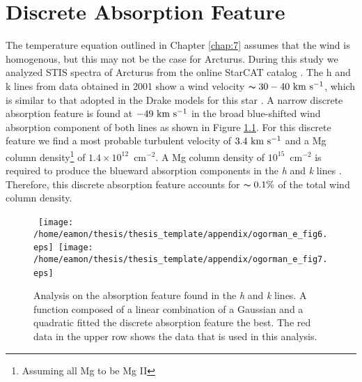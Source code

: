 
\chapter{Discrete Absorption Feature}\label{app:2}

The temperature equation outlined in Chapter \ref{chap:7} assumes that the wind is homogenous, but this may not be the case for Arcturus. During this study we analyzed STIS spectra of Arcturus from the online StarCAT catalog \citep{ayres_2010}. The  h and k lines from data obtained in 2001 show a wind velocity $ \thicksim 30-40 \ \rm{km \ s^{-1}}$, which is similar to that adopted in the Drake models for this star \cite{drake_1985}. A narrow discrete absorption feature is found at $-49 \ \rm{km \ s^{-1}}$ in the broad blue-shifted wind absorption component of both lines as shown in Figure \ref{fig:app2}. For this discrete feature we find a most probable turbulent velocity of $ 3.4 \ \rm{km \ s^{-1}}$ and a Mg column density\footnote{Assuming all Mg to be Mg II} of $1.4\times10^{12}$\, cm$^{-2}$. A Mg column density of $10^{15}$\, cm$^{-2}$ is required to produce the blueward absorption components in the \textit{h} and \textit{k} lines \citep{mcclintock_1978}. Therefore, this discrete absorption feature accounts for $\thicksim 0.1 \%$ of the total wind column density. 

\begin{figure}[hb!]
\centering 
\mbox{
          \texttt{[image: /home/eamon/thesis/thesis\_template/appendix/ogorman\_e\_fig6.eps]} 
          \texttt{[image: /home/eamon/thesis/thesis\_template/appendix/ogorman\_e\_fig7.eps]}
          }
\caption[]{Analysis on the absorption feature found in the  \textit{h} and \textit{k} lines. A function composed of a linear combination of a Gaussian and a quadratic fitted the discrete absorption feature the best. The red data in the upper row shows the data that is used in this analysis.}
\label{fig:app2}
\end{figure}